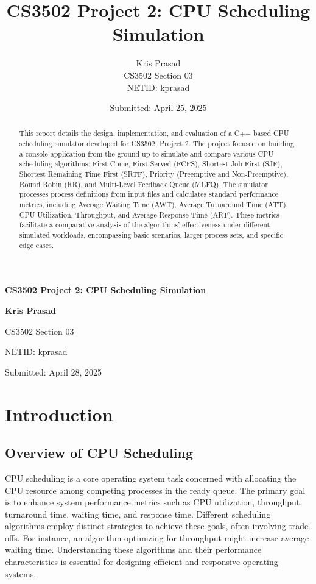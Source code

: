 \documentclass[12pt]{article}
\title{CS3502 Project 2: CPU Scheduling Simulation}
\author{Kris Prasad \\[0.5em]
CS3502 Section 03 \\[0.5em]
NETID: kprasad\\[0.5em]
}
\date{Submitted: April 25, 2025}
\begin{document}
\begin{titlepage}
    \centering
    \vspace*{2cm}
    
    {\LARGE\bfseries CS3502 Project 2: CPU Scheduling Simulation\par}
    \vspace{2cm}
    
    {\large\bfseries Kris Prasad\par}
    \vspace{0.5cm}
    {\large CS3502 Section 03\par}
    \vspace{0.5cm}
    {\large NETID: kprasad\par}
    \vspace{2cm}
    
    {\large Submitted: April 28, 2025\par}
    
    \vfill
    
\end{titlepage}

\newpage

\begin{abstract}
This report details the design, implementation, and evaluation of a C++ based CPU scheduling simulator developed for CS3502, Project 2. The project focused on building a console application from the ground up to simulate and compare various CPU scheduling algorithms: First-Come, First-Served (FCFS), Shortest Job First (SJF), Shortest Remaining Time First (SRTF), Priority (Preemptive and Non-Preemptive), Round Robin (RR), and Multi-Level Feedback Queue (MLFQ). The simulator processes process definitions from input files and calculates standard performance metrics, including Average Waiting Time (AWT), Average Turnaround Time (ATT), CPU Utilization, Throughput, and Average Response Time (ART). These metrics facilitate a comparative analysis of the algorithms' effectiveness under different simulated workloads, encompassing basic scenarios, larger process sets, and specific edge cases.
\end{abstract}

\newpage
\tableofcontents
\newpage

\section{Introduction}
\subsection{Overview of CPU Scheduling}
CPU scheduling is a core operating system task concerned with allocating the CPU resource among competing processes in the ready queue. The primary goal is to enhance system performance metrics such as CPU utilization, throughput, turnaround time, waiting time, and response time. Different scheduling algorithms employ distinct strategies to achieve these goals, often involving trade-offs. For instance, an algorithm optimizing for throughput might increase average waiting time. Understanding these algorithms and their performance characteristics is essential for designing efficient and responsive operating systems.
\end{document}
